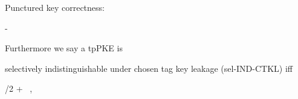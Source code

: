 \begin{definition}
\begin{sitemize}
        \item Punctured key correctness:
        \begin{bralign}
             - \negl\parr{\secpar}
        \end{bralign}
    \end{sitemize}
    Furthermore we say a tpPKE is
    \begin{sitemize}
        \item selectively indistinguishable under chosen tag key leakage (sel-IND-CTKL) iff
        \begin{bralign}
            /2 + \negl\parr{\secpar}
            \ ,
        \end{bralign}


\end{sitemize}
\end{definition}
